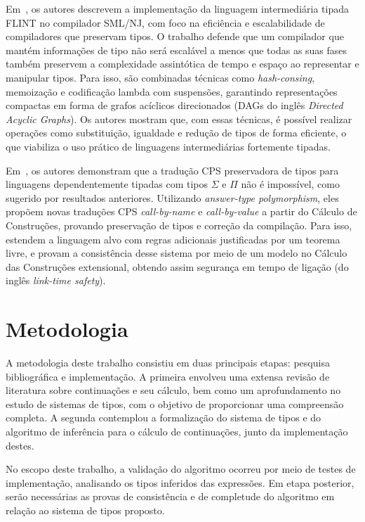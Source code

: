 Em~\cite{shao1998implementing}, os autores descrevem a implementação da linguagem intermediária tipada FLINT no compilador SML/NJ, com foco na eficiência e escalabilidade de compiladores que preservam tipos.
O trabalho defende que um compilador que mantém informações de tipo não será escalável a menos que todas as suas fases também preservem a complexidade assintótica de tempo e espaço ao representar e manipular tipos.
Para isso, são combinadas técnicas como \textit{hash-consing}, memoização e codificação lambda com suspensões, garantindo representações compactas em forma de grafos acíclicos direcionados (DAGs do inglês \textit{Directed Acyclic Graphs}).
Os autores mostram que, com essas técnicas, é possível realizar operações como substituição, igualdade e redução de tipos de forma eficiente, o que viabiliza o uso prático de linguagens intermediárias fortemente tipadas.

Em~\cite{bowman2018cps}, os autores demonstram que a tradução CPS preservadora de tipos para linguagens dependentemente tipadas com tipos $\Sigma$ e $\Pi$ não é impossível, como sugerido por resultados anteriores.
Utilizando \textit{answer-type polymorphism}, eles propõem novas traduções CPS \textit{call-by-name} e \textit{call-by-value} a partir do Cálculo de Construções, provando preservação de tipos e correção da compilação.
Para isso, estendem a linguagem alvo com regras adicionais justificadas por um teorema livre, e provam a consistência desse sistema por meio de um modelo no Cálculo das Construções extensional, obtendo assim segurança em tempo de ligação (do inglês \textit{link-time safety}).

\section{Metodologia}\label{sec:metodologia}

A metodologia deste trabalho consistiu em duas principais etapas: pesquisa bibliográfica e implementação.
A primeira envolveu uma extensa revisão de literatura sobre continuações e seu cálculo, bem como um aprofundamento no estudo de sistemas de tipos, com o objetivo de proporcionar uma compreensão completa.
A segunda contemplou a formalização do sistema de tipos e do algoritmo de inferência para o cálculo de continuações, junto da implementação destes.

No escopo deste trabalho, a validação do algoritmo ocorreu por meio de testes de implementação, analisando os tipos inferidos das expressões.
Em etapa posterior, serão necessárias as provas de consistência e de completude do algoritmo em relação ao sistema de tipos proposto.

